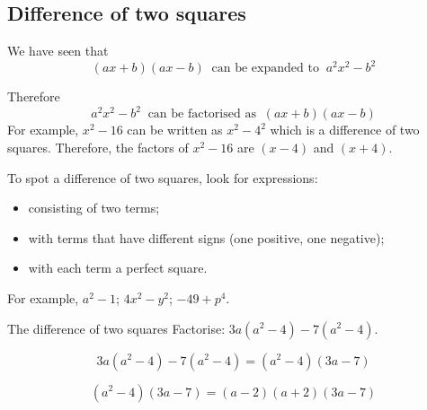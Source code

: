 \subsection* {Difference of two squares}
We have seen that 
\begin{equation*}
(ax+b)(ax-b)~\mbox{ can be expanded to }~{a}^{2}{x}^{2}-{b}^{2}
\end{equation*}

Therefore
\begin{equation*}
{a}^{2}{x}^{2}-{b}^{2}~\mbox{ can be factorised as }~(ax+b)(ax-b)
\end{equation*}
For example, ${x}^{2}-16$ can be written as ${x}^{2}-{4}^{2}$ which is a difference of two squares. Therefore, the factors of ${x}^{2}-16$ are $(x-4)$ and $(x+4)$.

\par
To spot a difference of two squares, look for expressions:
\begin{itemize}
\item consisting of two terms;
\item with terms that have different signs (one positive, one negative);
\item with each term a perfect square.
\end{itemize}
For example, $a^{2}-1$; $4x^{2}-y^{2}$; $-49+p^{4}$.




\begin{wex}{The difference of two squares}
{Factorise: $3a(a^2-4)-7(a^2-4)$.}
{


\begin{equation*}
  3a(a^2-4)-7(a^2-4) = (a^2-4)(3a-7)
\end{equation*}

$$
(a^2-4)(3a-7) = (a-2)(a+2)(3a-7)
$$
}
\end{wex}


